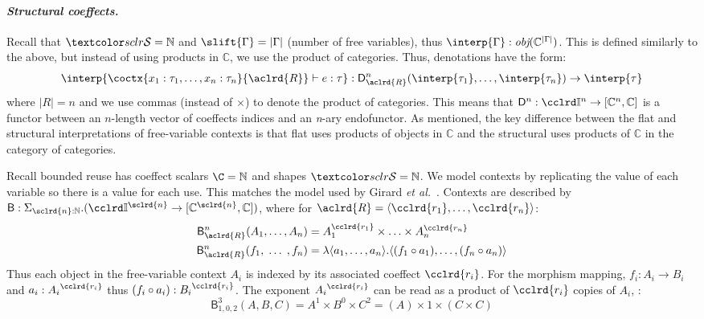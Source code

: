 \paragraph{\textnormal{\emph{Structural coeffects.}}}
Recall that $\SH = \mathbb{N}$ and $\slift{\Gamma} = |\Gamma|$
(number of free variables), thus 
$\interp{\Gamma} : \emph{obj}(\mathbb{C}^{|\Gamma|})$. This is defined similarly 
to the above, but instead of using products in $\mathbb{C}$, %
we use the product of categories. %
%
%
Thus, denotations have the form: 
$$
\interp{\coctx{x_1 : \tau_1, \ldots, x_n : \tau_n}{\aclrd{R}} \vdash e : \tau} : \D^n_{\aclrd{R}}
(\interp{\tau_1}, \ldots, \interp{\tau_n}) \rightarrow \interp{\tau}
$$
where $|R| = n$ and we use commas (instead of $\times$) to denote the product
of categories. %
This means that $\D^n : \Icat^n \rightarrow [\mathbb{C}^n,
\mathbb{C}]$ is a functor between an $n$-length vector of coeffects
indices and an \emph{n}-ary endofunctor.
As mentioned, the key
difference between the flat and structural interpretations of
free-variable contexts is that flat uses products of objects in
$\mathbb{C}$ and the structural uses products of $\mathbb{C}$ in 
the category of categories. %

\newcommand{\BLL}{\mathsf{B}}

\begin{example} Recall
bounded reuse has coeffect scalars $\C = \mathbb{N}$ and shapes $\SH = \mathbb{N}$.
We model contexts by replicating the value of each variable so 
there is a value for each use. This matches the model used by 
Girard \emph{et al.}~\cite{girard1992bounded}. Contexts are described by 
 $\BLL : \Sigma_{\sclrd{n} : \mathbb{N}}. (\Icat^{\sclrd{n}} \rightarrow [\mathbb{C}^{\sclrd{n}}, \mathbb{C}])$, 
where for $\aclrd{R} = \langle{\cclrd{r_1}, \ldots, \cclrd{r_n}}\rangle$: 
\begin{align*}
\BLL^n_{\aclrd{R}} (A_1, \ldots, A_n) & = A_1^{\cclrd{r_1}} \times \ldots \times A_n^{\cclrd{r_n}} \\
\BLL^n_{\aclrd{R}} (f_1, \;\ldots\;, f_n) & = \lambda \langle{a_1, \ldots, a_n}\rangle . \langle{(f_1 \circ a_1), \ldots, (f_n \circ a_n)}\rangle
\end{align*}
%
Thus each object in the free-variable context $A_i$ is indexed by its associated coeffect $\cclrd{r_i}$.
For the morphism mapping, $f_i : A_i \rightarrow B_i$ and $a_i : {A_i}^{\cclrd{r_i}}$ thus $(f_i \circ a_i) : {B_i}^{\cclrd{r_i}}$. 
The exponent ${A_i}^{\cclrd{r_i}}$ can be read as a product of $\cclrd{r_i}$ copies of $A_i$, \eg:
$$\BLL^3_{1,0,2} (A, B, C) = A^1 \times B^0 \times C^2 = (A) \times 1 \times (C \times C)$$
\label{exm:bll1}
\end{example}

